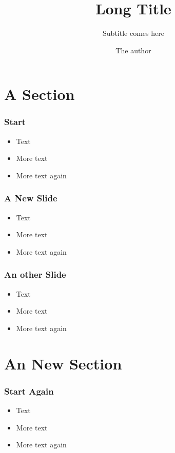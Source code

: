 \title[Short Title]{Long Title}
\subtitle{Subtitle comes here}
\author{The author}
\date{}



\maketitle




\section{A Section}

\begin{frame} 
\frametitle{Start}
\begin{itemize}[<+->]
 \item Text
 \item More text
 \item More text again
\end{itemize}
\end{frame}

\begin{frame} 
\frametitle{A New Slide}
\begin{itemize}[<+->]
 \item Text
 \item More text
 \item More text again
\end{itemize}
\end{frame}

\begin{frame} 
\frametitle{An other Slide}
\begin{itemize}[<+->]
 \item Text
 \item More text
 \item More text again
\end{itemize}
\end{frame}

\section{An New Section}
\begin{frame} 
\frametitle{Start Again}
\begin{itemize}[<+->]
 \item Text
 \item More text
 \item More text again
\end{itemize}
\end{frame}

